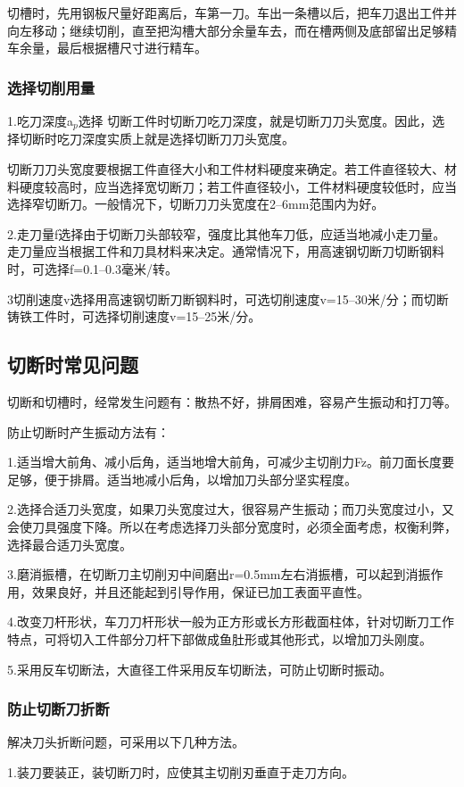 \documentclass{ctexbook}
\begin{document}
切槽时，先用钢板尺量好距离后，车第一刀。车出一条槽以后，把车刀退出工件并向左移动；继续切削，直至把沟槽大部分余量车去，而在槽两侧及底部留出足够精车余量，最后根据槽尺寸进行精车。
\subsubsection{选择切削用量}
1.吃刀深度a$_p$选择 切断工件时切断刀吃刀深度，就是切断刀刀头宽度。因此，选择切断时吃刀深度实质上就是选择切断刀刀头宽度。

切断刀刀头宽度要根据工件直径大小和工件材料硬度来确定。若工件直径较大、材料硬度较高时，应当选择宽切断刀；若工件直径较小，工件材料硬度较低时，应当选择窄切断刀。一般情况下，切断刀刀头宽度在2--6mm范围内为好。

2.走刀量f选择由于切断刀头部较窄，强度比其他车刀低，应适当地减小走刀量。走刀量应当根据工件和刀具材料来决定。通常情况下，用高速钢切断刀切断钢料时，可选择f=0.1--0.3毫米/转。

3切削速度v选择用高速钢切断刀断钢料时，可选切削速度v=15--30米/分；而切断铸铁工件时，可选择切削速度v=15--25米/分。
\subsection{切断时常见问题}
切断和切槽时，经常发生问题有：散热不好，排屑困难，容易产生振动和打刀等。

防止切断时产生振动方法有：

1.适当增大前角、减小后角，适当地增大前角，可减少主切削力Fz。前刀面长度要足够，便于排屑。适当地减小后角，以增加刀头部分坚实程度。

2.选择合适刀头宽度，如果刀头宽度过大，很容易产生振动；而刀头宽度过小，又会使刀具强度下降。所以在考虑选择刀头部分宽度时，必须全面考虑，权衡利弊，选择最合适刀头宽度。

3.磨消振槽，在切断刀主切削刃中间磨出r=0.5mm左右消振槽，可以起到消振作用，效果良好，并且还能起到引导作用，保证已加工表面平直性。

4.改变刀杆形状，车刀刀杆形状一般为正方形或长方形截面柱体，针对切断刀工作特点，可将切入工件部分刀杆下部做成鱼肚形或其他形式，以增加刀头刚度。

5.采用反车切断法，大直径工件采用反车切断法，可防止切断时振动。
\subsubsection{防止切断刀折断}
解决刀头折断问题，可采用以下几种方法。

1.装刀要装正，装切断刀时，应使其主切削刃垂直于走刀方向。
\end{document}
